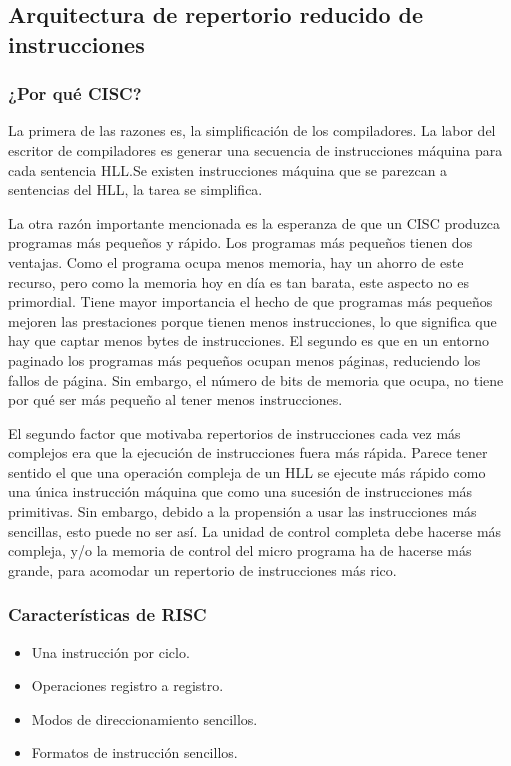 \subsection{Arquitectura de repertorio reducido de instrucciones}

\subsubsection*{¿Por qué CISC?}

La primera de las razones es, la simplificación de los compiladores. La labor del escritor de compiladores es generar una secuencia de instrucciones máquina para cada sentencia HLL.\@ Se existen instrucciones máquina que se parezcan a sentencias del HLL, la tarea se simplifica.

La otra razón importante mencionada es la esperanza de que un CISC produzca programas más pequeños y rápido. Los programas más pequeños tienen dos ventajas. Como el programa ocupa menos memoria, hay un ahorro de este recurso, pero como la memoria hoy en día es tan barata, este aspecto no es primordial. Tiene mayor importancia el hecho de que programas más pequeños mejoren las prestaciones porque tienen menos instrucciones, lo que significa que hay que captar menos bytes de instrucciones. El segundo es que en un entorno paginado los programas más pequeños ocupan menos páginas, reduciendo los fallos de página. Sin embargo, el número de bits de memoria que ocupa, no tiene por qué ser más pequeño al tener menos instrucciones.

El segundo factor que motivaba repertorios de instrucciones cada vez más complejos era que la ejecución de instrucciones fuera más rápida. Parece tener sentido el que una operación compleja de un HLL se ejecute más rápido como una única instrucción máquina que como una sucesión de instrucciones más primitivas. Sin embargo, debido a la propensión a usar las instrucciones más sencillas, esto puede no ser así. La unidad de control completa debe hacerse más compleja, y/o la memoria de control del micro programa ha de hacerse más grande, para acomodar un repertorio de instrucciones más rico.

\subsubsection*{Características de RISC}

\begin{itemize}
  \item Una instrucción por ciclo.
  \item Operaciones registro a registro.
  \item Modos de direccionamiento sencillos.
  \item Formatos de instrucción sencillos.
\end{itemize}

